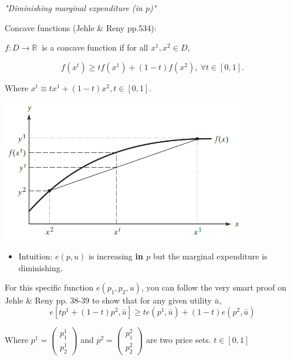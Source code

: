 \documentclass{article}
\newcommand{\R}{\mathbb{R}}
\begin{document}
\begin{mdframed}[backgroundcolor=blue!20,linecolor=white]

\textit{"Diminishing marginal expenditure (in $p$)"}

Concave functions (Jehle \& Reny pp.534):

$f : D \to \R \ $ is a concave function if for all $x^1, x^2 \in D$,

$$f(x^t) \ge tf(x^1) + (1 − t)f(x^2), \ \forall t \in [0, 1].$$

Where $x^t \equiv tx^1 + (1-t)x^2, t \in [0,1].$

\vspace{2mm}
{\centering
\includegraphics[width=0.8\textwidth]{2.concavef}
\label{cf}}
\vspace{2mm}


\begin{itemize}
\item Intuition: $e(p,u)$ is increasing \textbf{in $p$} but the marginal expenditure is diminishing.
\end{itemize}

For this specific function $e(p_1,p_2,u)$, you can follow the very smart proof on Jehle \& Reny pp. 38-39 to show that for any given utility $\bar{u}$, $$e[tp^1+(1-t)p^2,\bar{u}] \ge te(p^1,\bar{u}) + (1-t)e(p^2,\bar{u})$$

Where $p^1 = \left(\begin{smallmatrix}p^1_1 \\ p^1_2\end{smallmatrix}\right)$ and $p^2 = \left(\begin{smallmatrix}p^2_1 \\ p^2_2\end{smallmatrix}\right)$ are two price sets. $t \in [0,1]$

\vspace{2mm}



\end{mdframed}
\end{document}
